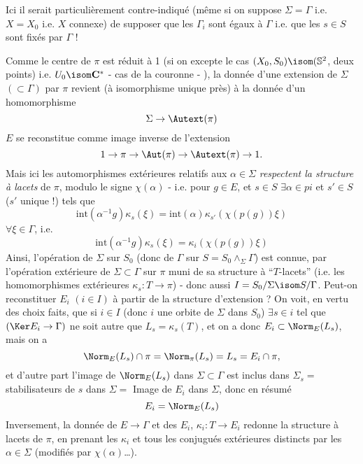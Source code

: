 Ici il serait particulièrement contre-indiqué (même si on suppose $\Sigma = \Gamma$ i.e. $X = X_0$ i.e. $X$ connexe) de supposer que les $\Gamma_i$ sont égaux à $\Gamma$ i.e. que les $s \in S$ sont fixés par $\Gamma$ !

Comme le centre de $\pi$ est réduit à 1 (si on excepte le cas $(X_0, S_0) \isom (\mathbb{S}^2$, deux points) i.e. $U_0 \isom \mathbf{C}^*$ - cas de la couronne - ), la donnée d'une extension de $\Sigma$ $(\subset  \Gamma)$ par $\pi$ revient (à isomorphisme unique près) à la donnée d'un homomorphisme
$$
\Sigma \to \Autext (\pi)
$$
$E$ se reconstitue comme image inverse de l'extension
$$
1 \to \pi \to \Aut (\pi) \to \Autext (\pi) \to 1.
$$
Mais ici les automorphismes extérieures relatifs aux $\alpha \in \Sigma$ \emph{respectent la structure à lacets} de $\pi$, modulo le signe $\chi (\alpha)$ - i.e. pour $g \in E$, et $s \in S$ $\exists \alpha \in pi$ et $s' \in S$ ($s'$ unique !) tels que
$$
\text{int}(\alpha^{-1} g) \kappa_s (\xi) = \text{int}(\alpha) \kappa_{s'} (\chi (p(g))\xi)
$$
$\forall \xi \in \Gamma$, i.e.
$$
\text{int}(\alpha^{-1} g) \kappa_s (\xi) = \kappa_i (\chi (p(g))\xi)
$$
Ainsi, l'opération de $\Sigma$ sur $S_0$ (donc de $\Gamma$ sur $S = S_0 \wedge_\Sigma \Gamma$) est connue, par l'opération extérieure de $\Sigma \subset  \Gamma$ sur $\pi$ muni de sa structure à ``$T$-lacets'' (i.e. les homomorphismes extérieures $\kappa_s: T \to \pi$) - donc aussi $I = S_0/\Sigma \isom S/\Gamma$. Peut-on reconstituer $E_i$ $(i \in I)$ à partir de la structure d'extension ? On voit, en vertu des choix faits, que si $i \in I$ (donc $i$ une orbite de $\Sigma$ dans $S_0$) $\exists s \in i$ tel que $(\Ker E_i \to \Gamma)$ ne soit autre que $L_s = \kappa_s (T)$, et on a donc $E_i \subset  \Norm_E (L_s)$, mais on a
$$
\Norm_E (L_s) \cap \pi = \Norm_\pi (L_s) = L_s = E_i \cap \pi,
$$
et d'autre part l'image de $\Norm_E (L_s)$ dans $\Sigma \subset  \Gamma$ est inclus dans $\Sigma_s =$ stabilisateurs de $s$ dans $\Sigma =$ Image de $E_i$ dans $\Sigma$, donc en résumé
$$
E_i = \Norm_E (L_s)
$$
Inversement, la donnée de $E \to \Gamma$ et des $E_i$, $\kappa_i: T \to E_i$ redonne la structure à lacets de $\pi$, en prenant les $\kappa_i$ et tous les conjugués extérieures distincts par les $\alpha \in \Sigma$ (modifiés par $\chi (\alpha)$\dots).

